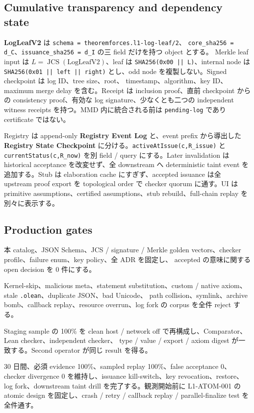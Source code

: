 \documentclass[a4paper,11pt]{ltjsarticle}
\newcommand{\term}[1]{\textbf{\color{TFNavy}#1}}
\newcommand{\code}[1]{\texttt{#1}}
\begin{document}
\subsection{Cumulative transparency and dependency state}

\term{LogLeafV2} は \code{schema = theoremforces.l1-log-leaf/2}、
\code{core\_sha256 = d\_C}、\code{issuance\_sha256 = d\_I} の三 field だけを持つ object とする。
Merkle leaf input は $L=\operatorname{JCS}(\mathrm{LogLeafV2})$、leaf は
\code{SHA256(0x00 || L)}、internal node は
\code{SHA256(0x01 || left || right)} とし、odd node を複製しない。Signed checkpoint は log ID、tree size、root、
timestamp、algorithm、key ID、maximum merge delay を含む。Receipt は inclusion proof、直前 checkpoint からの consistency
proof、有効な log signature、少なくとも二つの independent witness receipts を持つ。MMD 内に統合される前は
\code{pending-log} であり certificate ではない\cite{rfc9162}。

Registry は append-only \term{Registry Event Log} と、event prefix から導出した
\term{Registry State Checkpoint} に分ける。\code{activeAtIssue(c,R\_issue)} と
\code{currentStatus(c,R\_now)} を別 field / query にする。Later invalidation は historical acceptance を改変せず、全
downstream へ deterministic taint event を追加する。Stub は elaboration cache にすぎず、accepted issuance は全 upstream
proof export を topological order で checker quorum に通す。UI は primitive assumptions、certified assumptions、stub
rebuild、full-chain replay を別々に表示する。

\subsection{Production gates}

\begin{description}[style=nextline,leftmargin=10mm]
  \item[Gate 0 - Spec freeze]
  本 catalog、JSON Schema、JCS / signature / Merkle golden vectors、checker profile、failure enum、key policy、全 ADR を固定し、
  accepted の意味に関する open decision を 0 件にする。

  \item[Gate A - Adversarial CI]
  Kernel-skip、malicious meta、statement substitution、custom / native axiom、stale \code{.olean}、duplicate JSON、bad Unicode、
  path collision、symlink、archive bomb、callback replay、resource overrun、log fork の corpus を全件 reject する。

  \item[Gate B - Independent replay]
  Staging sample の 100\% を clean host / network off で再構成し、Comparator、Lean checker、independent checker、
  type / value / export / axiom digest が一致する。Second operator が同じ result を得る。

  \item[Gate C - Production readiness]
  30 日間、必須 evidence 100\%、sampled replay 100\%、false acceptance 0、checker divergence 0 を維持し、issuance
  kill-switch、key revocation、restore、log fork、downstream taint drill を完了する。観測開始前に L1-ATOM-001 の
  atomic design を固定し、crash / retry / callback replay / parallel-finalize test を全件通す。
\end{description}
\end{document}
